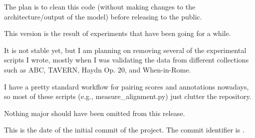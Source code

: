 The plan is to clean this code (without making changes to
the architecture/output of the model) before releasing to
the public.

This version is the result of experiments that have been
going for a while.

It is not stable yet, but I am planning on removing several
of the experimental scripts I wrote, mostly when I was
validating the data from different collections such as ABC,
TAVERN, Haydn Op. 20, and When-in-Rome.

I have a pretty standard workflow for pairing scores and
annotations nowadays, so most of these scripts (e.g.,
measure\_alignment.py) just clutter the repository.

Nothing major should have been omitted from this release.


This is the date of the initial commit of the project. The
commit identifier is .
